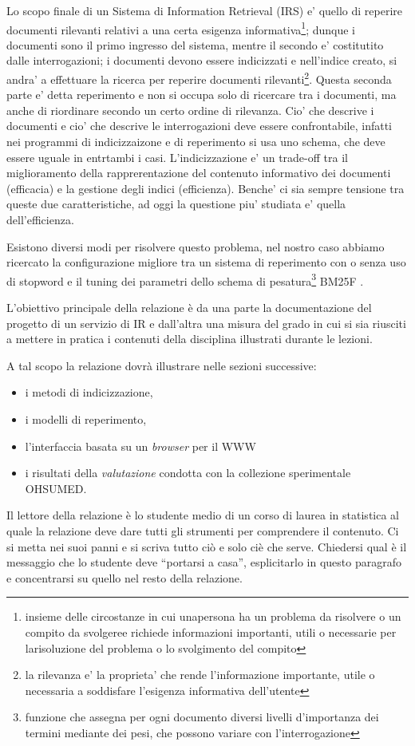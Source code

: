 \documentclass[runningheads]{llncs}
\begin{document}
Lo scopo finale di un Sistema di Information Retrieval (IRS) e' quello di reperire documenti rilevanti relativi a una certa esigenza informativa\footnote{insieme delle circostanze in cui unapersona ha un problema da risolvere o un compito da svolgeree richiede informazioni importanti, utili o necessarie per larisoluzione del problema o lo svolgimento del compito}; dunque i documenti sono il primo ingresso del sistema, mentre il secondo e' costitutito dalle interrogazioni; i documenti devono essere indicizzati e nell'indice creato, si andra' a effettuare la ricerca per reperire documenti rilevanti\footnote{la rilevanza e' la proprieta' che rende l'informazione importante, utile o necessaria a soddisfare l'esigenza informativa dell'utente}. Questa seconda parte e' detta reperimento e non si occupa solo di ricercare tra i documenti, ma anche di riordinare secondo un certo ordine di rilevanza. Cio' che descrive i documenti e cio' che descrive le interrogazioni deve essere confrontabile, infatti nei programmi di indicizzaizone e di reperimento si usa uno schema, che deve essere uguale in entrtambi i casi.
L'indicizzazione e' un trade-off tra il  miglioramento della rapprerentazione del contenuto informativo dei documenti (efficacia) e la gestione degli indici (efficienza). Benche' ci sia sempre tensione tra queste due caratteristiche, ad oggi la questione piu' studiata e' quella dell'efficienza.

Esistono diversi modi per risolvere questo problema, nel nostro caso abbiamo ricercato la configurazione migliore tra un sistema di
reperimento con o senza uso di stopword e il tuning dei parametri dello schema di pesatura\footnote{funzione che assegna per ogni documento diversi livelli d’importanza dei termini mediante dei pesi, che possono variare con l’interrogazione} BM25F \cite{WBC}.




L'obiettivo principale della relazione \`e da una parte la
documentazione del progetto di un servizio di {IR} e dall'altra una
misura del grado in cui si sia riusciti a mettere in pratica i
contenuti della disciplina illustrati durante le lezioni.

A tal scopo la relazione dovr\`a illustrare nelle sezioni successive:
\begin{itemize}
\item i metodi di indicizzazione,
\item i modelli di reperimento,
\item l'interfaccia basata su un \textit{browser} per il {WWW}
\item i risultati della \emph{valutazione} condotta con la collezione
  sperimentale OHSUMED.
\end{itemize}
Il lettore della relazione \`e lo studente medio di un corso di laurea
in statistica al quale la relazione deve dare tutti gli strumenti per
comprendere il contenuto.  Ci si metta nei suoi panni e si scriva
tutto ci\`o e solo ci\`e che serve.  Chiedersi qual \`e il messaggio
che lo studente deve ``portarsi a casa'', esplicitarlo in questo
paragrafo e concentrarsi su quello nel resto della relazione.
\end{document}

